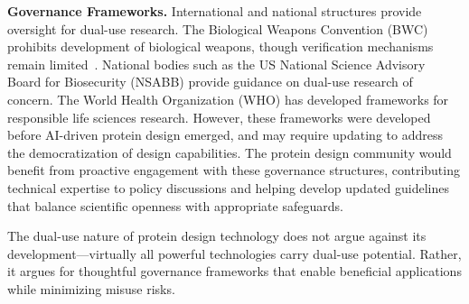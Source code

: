 \vspace{0.5em}
\noindent
\textbf{Governance Frameworks.} International and national structures provide oversight for dual-use research. The Biological Weapons Convention (BWC) prohibits development of biological weapons, though verification mechanisms remain limited~\citep{nrc2004biotechnology}. National bodies such as the US National Science Advisory Board for Biosecurity (NSABB) provide guidance on dual-use research of concern. The World Health Organization (WHO) has developed frameworks for responsible life sciences research. However, these frameworks were developed before AI-driven protein design emerged, and may require updating to address the democratization of design capabilities. The protein design community would benefit from proactive engagement with these governance structures, contributing technical expertise to policy discussions and helping develop updated guidelines that balance scientific openness with appropriate safeguards.

\vspace{0.5em}
\noindent
The dual-use nature of protein design technology does not argue against its development---virtually all powerful technologies carry dual-use potential. Rather, it argues for thoughtful governance frameworks that enable beneficial applications while minimizing misuse risks.
